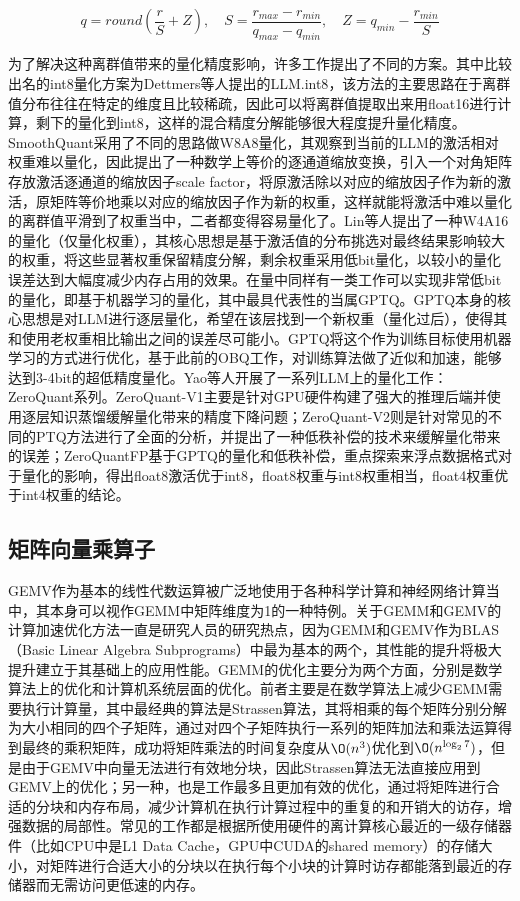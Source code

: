 \begin{equation}
    q = round\left(\frac{r}{S} + Z\right), \quad S=\frac{r_{max}-r_{min}}{q_{max}-q_{min}}, \quad Z=q_{min}-\frac{r_{min}}{S}
    \label{QuantEqu}
\end{equation}

为了解决这种离群值带来的量化精度影响，许多工作提出了不同的方案。其中比较出名的int8量化方案为Dettmers等人提出的LLM.int8\cite{LLMINT8}，该方法的主要思路在于离群值分布往往在特定的维度且比较稀疏，因此可以将离群值提取出来用float16进行计算，剩下的量化到int8，这样的混合精度分解能够很大程度提升量化精度。SmoothQuant采用了不同的思路\cite{SmoothQuant}做W8A8量化，其观察到当前的LLM的激活相对权重难以量化，因此提出了一种数学上等价的逐通道缩放变换，引入一个对角矩阵存放激活逐通道的缩放因子scale factor，将原激活除以对应的缩放因子作为新的激活，原矩阵等价地乘以对应的缩放因子作为新的权重，这样就能将激活中难以量化的离群值平滑到了权重当中，二者都变得容易量化了。Lin等人提出了一种W4A16的量化（仅量化权重）\cite{AWQ}，其核心思想是基于激活值的分布挑选对最终结果影响较大的权重，将这些显著权重保留精度分解，剩余权重采用低bit量化，以较小的量化误差达到大幅度减少内存占用的效果。在量中同样有一类工作可以实现非常低bit的量化，即基于机器学习的量化，其中最具代表性的当属GPTQ。GPTQ本身的核心思想是对LLM进行逐层量化，希望在该层找到一个新权重（量化过后），使得其和使用老权重相比输出之间的误差尽可能小。GPTQ将这个作为训练目标使用机器学习的方式进行优化，基于此前的OBQ工作\cite{OBQ}，对训练算法做了近似和加速，能够达到3-4bit的超低精度量化。Yao等人开展了一系列LLM上的量化工作：ZeroQuant系列\cite{ZeroQuant1,ZeroQuant2,ZeroQuantFP}。ZeroQuant-V1主要是针对GPU硬件构建了强大的推理后端并使用逐层知识蒸馏缓解量化带来的精度下降问题\cite{ZeroQuant1}；ZeroQuant-V2则是针对常见的不同的PTQ方法进行了全面的分析，并提出了一种低秩补偿的技术来缓解量化带来的误差\cite{ZeroQuant2}；ZeroQuantFP基于GPTQ的量化和低秩补偿，重点探索来浮点数据格式对于量化的影响，得出float8激活优于int8，float8权重与int8权重相当，float4权重优于int4权重的结论\cite{ZeroQuantFP}。

\subsection{矩阵向量乘算子}
GEMV作为基本的线性代数运算被广泛地使用于各种科学计算和神经网络计算当中，其本身可以视作GEMM中矩阵维度为1的一种特例。关于GEMM和GEMV的计算加速优化方法一直是研究人员的研究热点，因为GEMM和GEMV作为BLAS（Basic Linear Algebra Subprograms）中最为基本的两个，其性能的提升将极大提升建立于其基础上的应用性能。GEMM的优化主要分为两个方面，分别是数学算法上的优化和计算机系统层面的优化。前者主要是在数学算法上减少GEMM需要执行计算量，其中最经典的算法是Strassen算法\cite{Strassen}，其将相乘的每个矩阵分别分解为大小相同的四个子矩阵，通过对四个子矩阵执行一系列的矩阵加法和乘法运算得到最终的乘积矩阵，成功将矩阵乘法的时间复杂度从$\O(n^3)$优化到$\O(n^{\log_{2}7})$，但是由于GEMV中向量无法进行有效地分块，因此Strassen算法无法直接应用到GEMV上的优化；另一种，也是工作最多且更加有效的优化，通过将矩阵进行合适的分块和内存布局，减少计算机在执行计算过程中的重复的和开销大的访存，增强数据的局部性。常见的工作都是根据所使用硬件的离计算核心最近的一级存储器件（比如CPU中是L1 Data Cache，GPU中CUDA的shared memory\cite{Cuda}）的存储大小，对矩阵进行合适大小的分块以在执行每个小块的计算时访存都能落到最近的存储器而无需访问更低速的内存。

